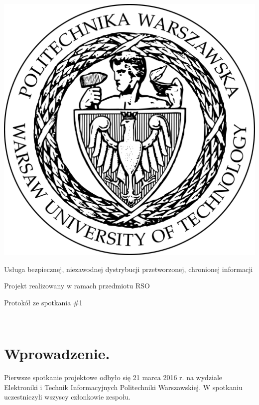 \documentclass[a4paper,11pt]{article}
\author{
  Daniel Danilewicz \\
  Marek Dzienisiuk \\
  Piotr Dziewicki \\
  Wiktor Garbacz \\
  Maciej Kucharski \\
  Tomasz Pęksa \\
  Paweł Stiasny
}
\date{21 marca 2016}
\begin{document}
\makeatletter
\begin{titlepage}

\begin{center}
  \includegraphics[scale=0.1]{Logo_PW_black.png} \\
  \vspace{50pt}
  
  {\LARGE Usługa bezpiecznej, niezawodnej dystrybucji przetworzonej, chronionej informacji} \\
  \vspace{10pt}
  
  {\large Projekt realizowany w ramach przedmiotu RSO} \\
  \vspace{40pt}
  
  {\Huge Protokół ze spotkania \#1} \\
  \vspace{30pt}
  
  {\@author} \\
  \vspace{10pt}
  
  {\@date}
\end{center}

\end{titlepage}
\makeatother

\section{Wprowadzenie.}
  Pierwsze spotkanie projektowe odbyło się 21 marca 2016 r. na wydziale Elektroniki i Technik Informacyjnych Politechniki Warszawskiej.
  W spotkaniu uczestniczyli wszyscy członkowie zespołu.
\end{document}
